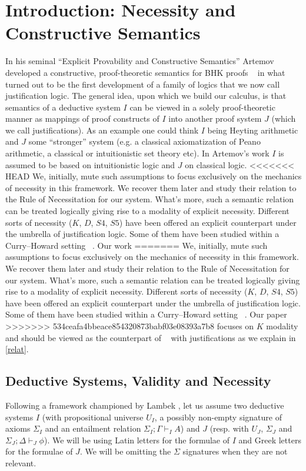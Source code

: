 \section{Introduction: Necessity and Constructive Semantics}
In his seminal ``Explicit Provability and Constructive Semantics'' \cite{Artemov2001} 
Artemov developed a constructive, proof-theoretic semantics for 
\acs{BHK} proofs ~\cite{Troelstra1988} 
in what turned out to be the first development of a family of logics that we now call justification logic.
The general idea, upon which we build our calculus, is that semantics of a deductive system $I$ can be 
viewed in a solely proof-theoretic manner 
as mappings of proof constructs of $I$ into another proof system $J$ (which we call justifications).
As an example one could think  $I$  being  Heyting arithmetic and $J$ some  ``stronger'' system 
(e.g. a classical axiomatization of Peano arithmetic, a classical or intuitionistic set theory etc). 
 In Artemov's work $I$ is assumed to be
based on intuitionistic logic and $J$  on classical logic. 
<<<<<<< HEAD
We, initially,  mute such assumptions to focus exclusively 
on the mechanics of necessity in this framework.
We recover them later and study  their relation  to  
the Rule of Necessitation for our system.
What's more,  such a semantic relation can be treated 
logically giving  rise to a modality of explicit necessity. 
Different sorts of necessity
($K$, $D$, $S4$, $S5$) have been offered  an explicit counterpart under the umbrella of justification logic. Some of them have been studied within a
Curry--Howard setting ~\cite{ArtBon07LFCS}. Our work
=======
We, initially,  mute such assumptions to focus exclusively on the mechanics of necessity in this framework.
We recover them later and study  their relation  to  the Rule of Necessitation for our system.
What's more,  such a semantic relation can be treated logically giving  rise to a modality of explicit necessity. 
Different sorts of necessity
($K$, $D$, $S4$, $S5$) have been offered  an explicit counterpart under the umbrella of justification logic. 
Some of them have been studied within a
Curry--Howard setting ~\cite{ArtBon07LFCS}. Our paper
>>>>>>> 534ceafa4bbeace854320873babf03e08393a7b8
focuses on  $K$ modality and  should be viewed as the  counterpart of ~\cite{Bellin2001} with justifications as we explain in \ref{relat}.
\subsection{Deductive Systems, Validity and Necessity}
Following a framework championed by Lambek \cite{Lambek1968,Lambek1969}, let us  assume two deductive systems $I$ 
(with propositional universe $U_I$, 
a possibly non-empty signature of axioms $\Sigma_I$ and an entailment relation $\Sigma_I;\Gamma\vdash_{I}A$) and $J$ 
(resp. with  $U_J$, $\Sigma_J$ and $\Sigma_J;\Delta\vdash_J \phi$). We will be using Latin letters for the formulae of $I$ and Greek letters for the formulae of $J$.
We will be omitting the $\Sigma$ signatures when they are not relevant.

